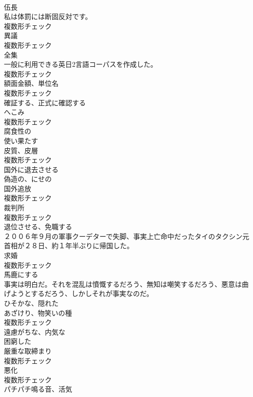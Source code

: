 \documentclass[8pt]{extreport}
\begin{document}
\begin{CJK}{UTF8}{min}
\\	[名詞]	伍⻑	
\\	私は体罰には断固反対です。	
\\	複数形チェック
\\	[名詞]	異議	
\\	複数形チェック
\\	[名詞]	全集	
\\	一般に利用できる英日2言語コーパスを作成した。	
\\	複数形チェック
\\	[名詞]	額面金額、単位名	
\\	複数形チェック
\\	[動詞]	確証する、正式に確認する	
\\	[名詞]	へこみ	
\\	複数形チェック
\\	[形容詞]	腐食性の	
\\	[動詞]	使い果たす	
\\	[名詞]	皮質、皮層	
\\	複数形チェック
\\	[動詞]	国外に退去させる	
\\	[形容詞]	偽造の、にせの	
\\	[名詞]	国外追放	
\\	複数形チェック
\\	[名詞]	裁判所	
\\	複数形チェック
\\	[動詞]	退位させる、免職する	
\\	２００６年９月の軍事クーデターで失脚、事実上亡命中だったタイのタクシン元首相が２８日、約１年半ぶりに帰国した。	
\\	[名詞]	求婚	
\\	複数形チェック
\\	[動詞]	馬鹿にする	
\\	事実は明白だ。それを混乱は憤慨するだろう、無知は嘲笑するだろう、悪意は曲げようとするだろう、しかしそれが事実なのだ。	
\\	[形容詞]	ひそかな、隠れた	
\\	[名詞]	あざけり、物笑いの種	
\\	複数形チェック
\\	[形容詞]	遠慮がちな、内気な	
\\	[形容詞]	困窮した	
\\	[名詞]	厳重な取締まり	
\\	複数形チェック
\\	[名詞]	悪化	
\\	複数形チェック
\\	[名詞]	パチパチ鳴る音、活気	

\end{CJK}
\end{document}
